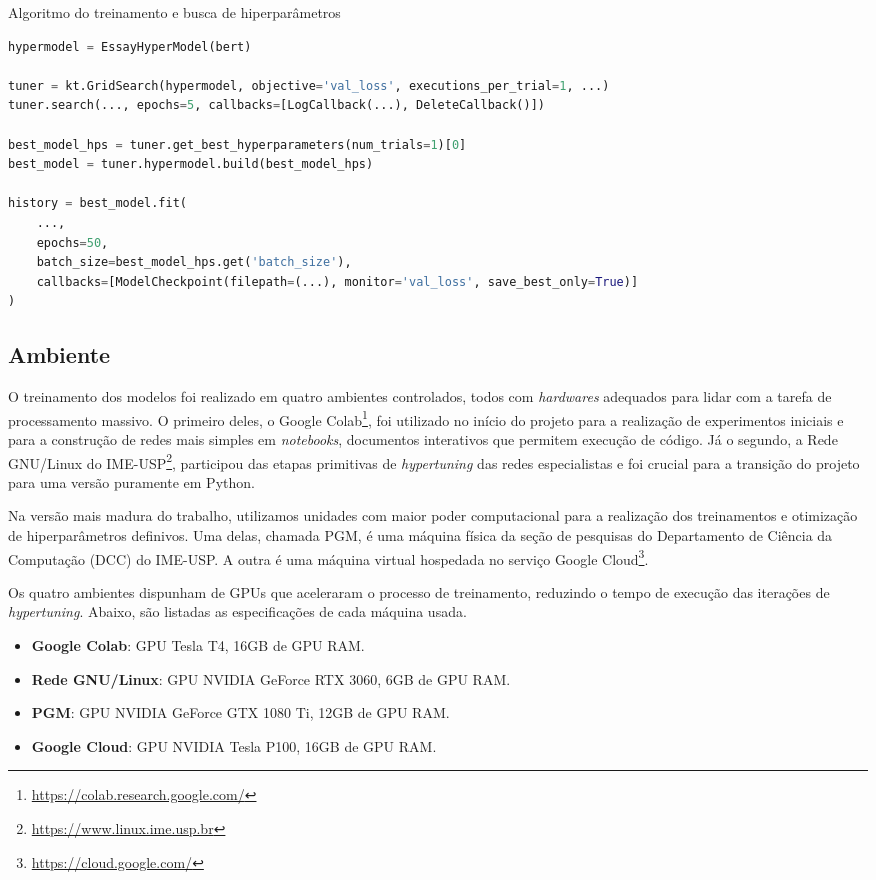 \begin{program}
    \centering
    \caption{Algoritmo do treinamento e busca de hiperparâmetros}
    \label{alg:search-and-train}
\begin{lstlisting}[language=Python]
hypermodel = EssayHyperModel(bert)

tuner = kt.GridSearch(hypermodel, objective='val_loss', executions_per_trial=1, ...)
tuner.search(..., epochs=5, callbacks=[LogCallback(...), DeleteCallback()])

best_model_hps = tuner.get_best_hyperparameters(num_trials=1)[0]
best_model = tuner.hypermodel.build(best_model_hps)

history = best_model.fit(
    ...,
    epochs=50,
    batch_size=best_model_hps.get('batch_size'),
    callbacks=[ModelCheckpoint(filepath=(...), monitor='val_loss', save_best_only=True)]
)
\end{lstlisting}
\end{program}

\subsection{Ambiente}

O treinamento dos modelos foi realizado em quatro ambientes controlados, todos com \textit{hardwares} adequados para lidar com a tarefa de processamento massivo. O primeiro deles, o Google Colab\footnote{\url{https://colab.research.google.com/}}, foi utilizado no início do projeto para a realização de experimentos iniciais e para a construção de redes mais simples em \textit{notebooks}, documentos interativos que permitem execução de código. Já o segundo, a Rede GNU/Linux do IME-USP\footnote{\url{https://www.linux.ime.usp.br}}, participou das etapas primitivas de \textit{hypertuning} das redes especialistas e foi crucial para a transição do projeto para uma versão puramente em Python.

Na versão mais madura do trabalho, utilizamos unidades com maior poder computacional para a realização dos treinamentos e otimização de hiperparâmetros definivos. Uma delas, chamada PGM, é uma máquina física da seção de pesquisas do Departamento de Ciência da Computação (DCC) do IME-USP. A outra é uma máquina virtual hospedada no serviço Google Cloud\footnote{\url{https://cloud.google.com/}}.

Os quatro ambientes dispunham de GPUs que aceleraram o processo de treinamento, reduzindo o tempo de execução das iterações de \textit{hypertuning}. Abaixo, são listadas as especificações de cada máquina usada.

\begin{itemize}
    \item \textbf{Google Colab}: GPU Tesla T4, 16GB de GPU RAM.
    \item \textbf{Rede GNU/Linux}: GPU NVIDIA GeForce RTX 3060, 6GB de GPU RAM.
    \item \textbf{PGM}: GPU NVIDIA GeForce GTX 1080 Ti, 12GB de GPU RAM.
    \item \textbf{Google Cloud}: GPU NVIDIA Tesla P100, 16GB de GPU RAM.
\end{itemize}
